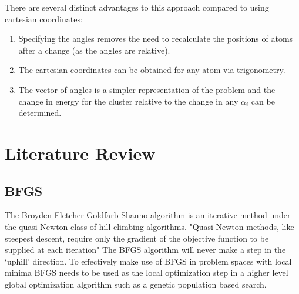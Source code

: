 \documentclass[conference,letterpaper]{IEEEtran}
\begin{document}
There are several distinct advantages to this approach compared to using cartesian coordinates:
\begin{enumerate}
    \item Specifying the angles removes the need to recalculate the positions of atoms after a change (as the angles are relative).
    \item The cartesian coordinates can be obtained for any atom via trigonometry.
    \item The vector of angles is a simpler representation of the problem and the change in energy for the cluster relative to the change in any $\alpha_{i}$ can be determined.
\end{enumerate}


\section{Literature Review}
\subsection{BFGS}
The Broyden-Fletcher-Goldfarb-Shanno algorithm is an iterative method under the quasi-Newton class of hill climbing algorithms. "Quasi-Newton methods, like steepest descent, require only the gradient of the objective function to be supplied at each iteration" \cite{numericalOptimization}
The BFGS algorithm will never make a step in the `uphill' direction. To effectively make use of BFGS in problem spaces with local minima BFGS needs to be used as the local optimization step in a higher level global optimization algorithm such as a genetic population based search.
\end{document}
